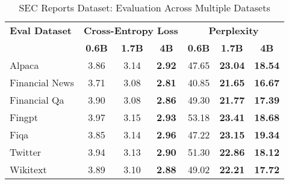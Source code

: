 
\begin{table}[h]
\centering
\caption[SEC Reports: Evaluation Results]{SEC Reports Dataset: Evaluation Across Multiple Datasets}
\label{tab:sec_reports_results}
\begin{tabular}{l|ccc|ccc}
\hline
\textbf{Eval Dataset} & \multicolumn{3}{c|}{\textbf{Cross-Entropy Loss}} & \multicolumn{3}{c}{\textbf{Perplexity}} \\
\cline{2-4} \cline{5-7}
  & \textbf{0.6B} & \textbf{1.7B} & \textbf{4B} & \textbf{0.6B} & \textbf{1.7B} & \textbf{4B} \\
Alpaca & 3.86 & 3.14 & \textbf{2.92} & 47.65 & \textbf{23.04} & \textbf{18.54} \\
Financial News & 3.71 & 3.08 & \textbf{2.81} & 40.85 & \textbf{21.65} & \textbf{16.67} \\
Financial Qa & 3.90 & 3.08 & \textbf{2.86} & 49.30 & \textbf{21.77} & \textbf{17.39} \\
Fingpt & 3.97 & 3.15 & \textbf{2.93} & 53.18 & \textbf{23.41} & \textbf{18.68} \\
Fiqa & 3.85 & 3.14 & \textbf{2.96} & 47.22 & \textbf{23.15} & \textbf{19.34} \\
Twitter & 3.94 & 3.13 & \textbf{2.90} & 51.30 & \textbf{22.86} & \textbf{18.12} \\
Wikitext & 3.89 & 3.10 & \textbf{2.88} & 49.02 & \textbf{22.21} & \textbf{17.72} \\
\hline
\end{tabular}
\end{table}

